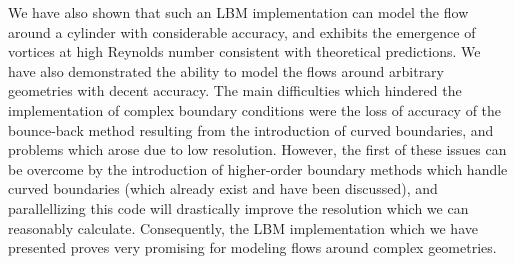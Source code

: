 \documentclass[a4paper]{article}
\begin{document}
We have also shown that such an LBM implementation can model the flow around a cylinder with considerable accuracy, and exhibits the emergence of vortices at high Reynolds number consistent with theoretical predictions. We have also demonstrated the ability to model the flows around arbitrary geometries with decent accuracy. The main difficulties which hindered the implementation of complex boundary conditions were the loss of accuracy of the bounce-back method resulting from the introduction of curved boundaries, and problems which arose due to low resolution. However, the first of these issues can be overcome by the introduction of higher-order boundary methods which handle curved boundaries (which already exist and have been discussed), and parallellizing this code will drastically improve the resolution which we can reasonably calculate. Consequently, the LBM implementation which we have presented proves very promising for modeling flows around complex geometries.  



\end{document}
